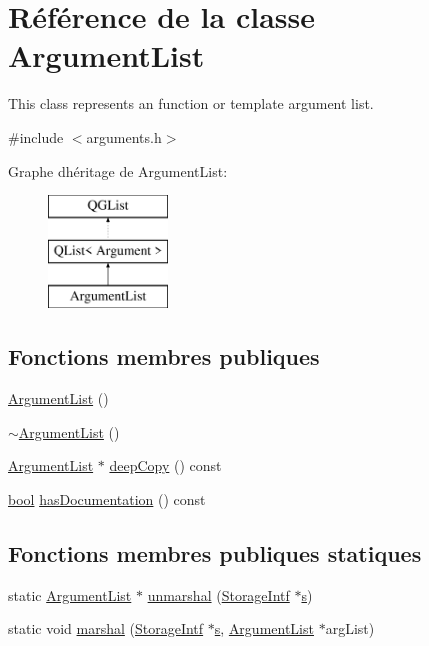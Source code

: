 \hypertarget{class_argument_list}{}\section{Référence de la classe Argument\+List}
\label{class_argument_list}


This class represents an function or template argument list.  




{\ttfamily \#include $<$arguments.\+h$>$}

Graphe d\textquotesingle{}héritage de Argument\+List\+:\begin{figure}[H]
\begin{center}
\leavevmode
\includegraphics[height=3.000000cm]{class_argument_list}
\end{center}
\end{figure}
\subsection*{Fonctions membres publiques}
\begin{DoxyCompactItemize}
\item 
\hyperlink{class_argument_list_a2f46f024604fbd06eb4f2d18f97f74c0}{Argument\+List} ()
\item 
\hyperlink{class_argument_list_a208ee05222465738505facb0b24e0380}{$\sim$\+Argument\+List} ()
\item 
\hyperlink{class_argument_list}{Argument\+List} $\ast$ \hyperlink{class_argument_list_a57a064d6f3ba77dbc19ce8b768eb3909}{deep\+Copy} () const 
\item 
\hyperlink{qglobal_8h_a1062901a7428fdd9c7f180f5e01ea056}{bool} \hyperlink{class_argument_list_a2a3058f54bea8d3f320bba8ec6ffcb2b}{has\+Documentation} () const 
\end{DoxyCompactItemize}
\subsection*{Fonctions membres publiques statiques}
\begin{DoxyCompactItemize}
\item 
static \hyperlink{class_argument_list}{Argument\+List} $\ast$ \hyperlink{class_argument_list_afa737f8c786a4ea7e3e14d7baf063aea}{unmarshal} (\hyperlink{class_storage_intf}{Storage\+Intf} $\ast$\hyperlink{060__command__switch_8tcl_a011c73f2dbb87635a3b4206c72355f6e}{s})
\item 
static void \hyperlink{class_argument_list_ab46945cd744a8c28a8c30c40849d32d1}{marshal} (\hyperlink{class_storage_intf}{Storage\+Intf} $\ast$\hyperlink{060__command__switch_8tcl_a011c73f2dbb87635a3b4206c72355f6e}{s}, \hyperlink{class_argument_list}{Argument\+List} $\ast$arg\+List)
\end{DoxyCompactItemize}
